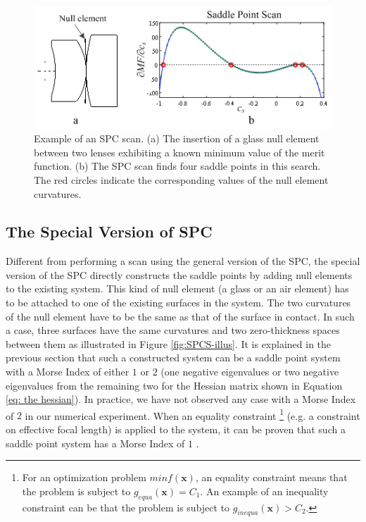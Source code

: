 \begin{figure}[h!]
    \centering
    \includegraphics[scale=0.8]{chapter-2/figures/SPCscan.png}
    \caption{Example of an SPC scan. (a) The insertion of a glass null element between two lenses exhibiting a known minimum value of the merit function. (b) The SPC scan finds four saddle points in this search. The red circles indicate the corresponding values of the null element curvatures.}
    \label{fig:SPCscan}
\end{figure}

\subsection{The Special Version of SPC}
\label{SPC_Special}
Different from performing a scan using the general version of the SPC, the special version of the SPC directly constructs the saddle points by adding null elements to the existing system. This kind of null element (a glass or an air element) has to be attached to one of the existing surfaces in the system. The two curvatures of the null element have to be the same as that of the surface in contact. In such a case, three surfaces have the same curvatures and two zero-thickness spaces between them as illustrated in Figure \ref{fig:SPCS-illus}. It is explained in the previous section that such a constructed system can be a saddle point system with a Morse Index of either $1$ or $2$ (one negative eigenvalues or two negative eigenvalues from the remaining two for the Hessian matrix shown in Equation \ref{eq: the hessian}). In practice, we have not observed any case with a Morse Index of $2$ in our numerical experiment. When an equality constraint \footnote{For an optimization problem $min f(\mathbf{x})$, an equality constraint means that the problem is subject to $g_{equa}(\mathbf{x})=C_1$. An example of an inequality constraint can be that the problem is subject to $g_{inequa}(\mathbf{x}) > C_2$.} (e.g. a constraint on effective focal length) is applied to the system, it can be proven that such a saddle point system has a Morse Index of $1$ \cite{BociortSPCSexplained}.

